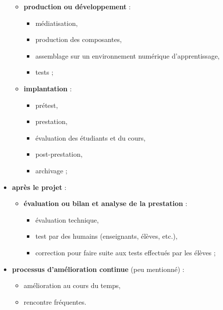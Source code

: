 \begin{frame}[allowframebreaks]
\begin{itemize}
\begin{itemize}
							\item \textbf{production ou développement} :
								\begin{itemize}
								\item médiatisation,
								\item production des composantes,
								\item assemblage sur un environnement numérique d'apprentissage,
								\item tests ;
								\end{itemize}
							\framebreak
							\item \textbf{implantation} :
								\begin{itemize}
								\item prétest, 
								\item prestation,
								\item évaluation des étudiants et du cours,
								\item post-prestation,
								\item archivage ;
								\end{itemize}
							\end{itemize}
						\framebreak
						\item \textbf{après le projet} : 
							\begin{itemize}
							\item \textbf{évaluation ou bilan et analyse de la prestation} :
								\begin{itemize}
								\item évaluation technique,
								\item test par des humains (enseignants, élèves, etc.),
								\item correction pour faire suite aux tests effectués par les élèves ;
								\end{itemize}
							\end{itemize}	
						\item \textbf{processus d'amélioration continue} (peu mentionné) :
								\begin{itemize}
								\item amélioration au cours du temps, 
								\item rencontre fréquentes.
								\end{itemize}
						\end{itemize}		
							
						
					\end{frame}
							
						
